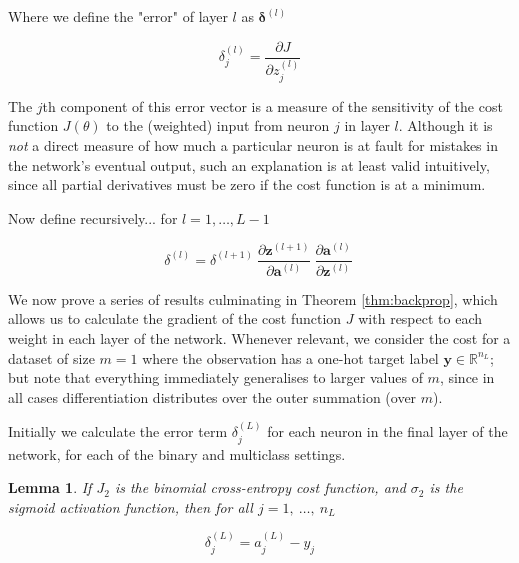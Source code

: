 \documentclass{article}[11pt]
\newtheorem{lemma}{Lemma}
\begin{document}
        Where we define the "error" of layer $l$ as $\boldsymbol{\delta}^{(l)}$
    
        $$
        \delta^{(l)}_j = \frac{\partial J}{\partial z^{(l)}_j}
        $$
        
        The $j$th component of this error vector is a measure of the sensitivity of the cost function $J(\theta)$ to the (weighted) input from neuron $j$ in layer $l$. Although it is \textit{not} a direct measure of how much a particular neuron is at fault for mistakes in the network's eventual output, such an explanation is at least valid intuitively, since all partial derivatives must be zero if the cost function is at a minimum.
        
        
        Now define recursively... for $l = 1, \ldots, L-1$
        
        $$
        \delta^{(l)} =
        \delta^{(l+1)} \
        \frac{\partial \mathbf{z}^{(l+1)}}{\partial \mathbf{a}^{(l)}} \
        \frac{\partial \mathbf{a}^{(l)}}{\partial \mathbf{z}^{(l)}} \
        $$
        
        
        
        
        We now prove a series of results culminating in Theorem \ref{thm:backprop}, which allows us to calculate the gradient of the cost function $J$ with respect to each weight in each layer of the network. Whenever relevant, we consider the cost for a dataset of size $m = 1$ where the observation has a one-hot target label $\mathbf{y} \in \mathbb{R}^{n_L}$; but note that everything immediately generalises to larger values of $m$, since in all cases differentiation distributes over the outer summation (over $m$).
        
        Initially we calculate the error term $\delta^{(L)}_j$ for each neuron in the final layer of the network, for each of the binary and multiclass settings.
        
        
        \begin{lemma}
            
            If $J_2$ is the binomial cross-entropy cost function, and $\sigma_2$ is the sigmoid activation function, then for all $j = 1, \ \ldots, \ n_L$
            
            $$
            \delta^{(L)}_j = a^{(L)}_j - y_j
            $$
            
        \end{lemma}
        
\end{document}
